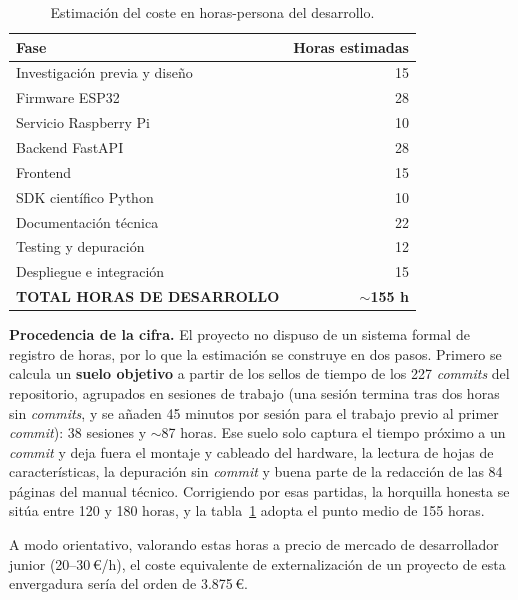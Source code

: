 \begin{table}[H]
    \centering
    \caption{Estimaci\'on del coste en horas-persona del desarrollo.}
    \label{tab:horas}
    \begin{tabular}{lr}
        \toprule
        \textbf{Fase} & \textbf{Horas estimadas} \\
        \midrule
        Investigaci\'on previa y dise\~no   & 15 \\
        Firmware ESP32                       & 28 \\
        Servicio Raspberry Pi                & 10 \\
        Backend FastAPI                      & 28 \\
        Frontend                             & 15 \\
        SDK cient\'ifico Python              & 10 \\
        Documentaci\'on t\'ecnica            & 22 \\
        Testing y depuraci\'on               & 12 \\
        Despliegue e integraci\'on           & 15 \\
        \midrule
        \textbf{TOTAL HORAS DE DESARROLLO}   & \textbf{$\sim$155 h} \\
        \bottomrule
    \end{tabular}
\end{table}

\textbf{Procedencia de la cifra.} El proyecto no dispuso de un sistema
formal de registro de horas, por lo que la estimaci\'on se construye en
dos pasos. Primero se calcula un \textbf{suelo objetivo} a partir de los
sellos de tiempo de los 227 \textit{commits} del repositorio, agrupados
en sesiones de trabajo (una sesi\'on termina tras dos horas sin
\textit{commits}, y se a\~naden 45 minutos por sesi\'on para el trabajo
previo al primer \textit{commit}): 38 sesiones y $\sim$87 horas. Ese
suelo solo captura el tiempo pr\'oximo a un \textit{commit} y deja fuera
el montaje y cableado del hardware, la lectura de hojas de
caracter\'isticas, la depuraci\'on sin \textit{commit} y buena parte de
la redacci\'on de las 84 p\'aginas del manual t\'ecnico. Corrigiendo por
esas partidas, la horquilla honesta se sit\'ua entre 120 y 180 horas, y
la tabla~\ref{tab:horas} adopta el punto medio de 155 horas.

A modo orientativo, valorando estas horas a precio de mercado de
desarrollador junior (20--30\,\euro/h), el coste equivalente de
externalizaci\'on de un proyecto de esta envergadura ser\'ia del orden de
3.875\,\euro.

